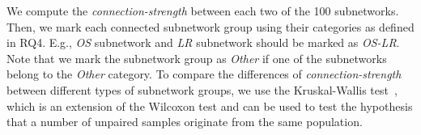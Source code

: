 \documentclass[sigconf]{acmart}
\begin{document}

We compute the \emph{connection-strength} between each two of the 100 subnetworks. %
Then, we mark each connected subnetwork group using their 
categories as defined in RQ4. E.g., \emph{OS} subnetwork and \emph{LR} subnetwork should be marked as \emph{OS-LR}. 
Note that we mark the subnetwork group as \emph{Other} if one of the subnetworks belong to the \emph{Other} category. %
To compare the differences of \emph{connection-strength} between different types of subnetwork groups, we use the Kruskal-Wallis test~\cite{mckight2010kruskal}, which is an extension of the Wilcoxon test and can be used to test the hypothesis that a number of unpaired samples originate from the same population. 
\end{document}

